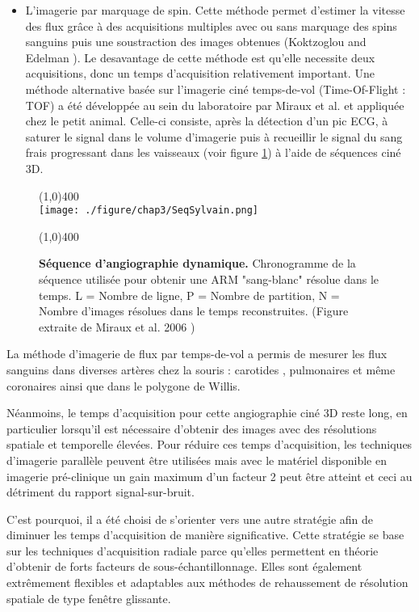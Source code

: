 \begin{itemize}
\item L’imagerie par marquage de spin. Cette méthode permet d’estimer la vitesse des flux grâce à des acquisitions multiples avec ou sans marquage des spins sanguins puis une soustraction des images obtenues (Koktzoglou and Edelman \cite{Koktzoglou:2009fe}). Le desavantage de cette méthode est qu’elle necessite deux acquisitions, donc un temps d’acquisition relativement important.
Une méthode alternative basée sur l’imagerie ciné temps-de-vol (Time-Of-Flight : TOF) a été développée au sein du laboratoire par  Miraux et al. \cite{Miraux:2006fu} et appliquée chez le petit animal. Celle-ci consiste, après la détection d’un pic ECG, à saturer le signal dans le volume d'imagerie puis à recueillir le signal du sang frais progressant dans les vaisseaux (voir figure \ref{fig:SeqSylvain}) à l’aide de séquences ciné 3D.
\end{itemize}

\begin{figure}[H]
\centering
\line(1,0){400} \\
\texttt{[image: ./figure/chap3/SeqSylvain.png]}
\caption[Séquence d'angiographie dynamique.]{\label{fig:SeqSylvain} \textbf{Séquence d'angiographie dynamique.} Chronogramme de la séquence utilisée pour obtenir une ARM "sang-blanc" résolue dans le temps. L = Nombre de ligne, P = Nombre de partition, N = Nombre d'images résolues dans le temps reconstruites. (Figure extraite de Miraux et al. 2006 \cite{Miraux:2006fu})}
\line(1,0){400} \\ \end{figure}

La méthode d'imagerie de flux par temps-de-vol a permis de mesurer les flux sanguins dans diverses artères chez la souris : carotides \cite{Miraux:2006fu}, pulmonaires \cite{Cochet:2013dk} et même coronaires \cite{Cochet:2010ec} ainsi que dans le polygone de Willis.

Néanmoins, le temps d’acquisition pour cette angiographie ciné 3D reste long, en particulier lorsqu’il est nécessaire d’obtenir des images avec des résolutions spatiale et temporelle élevées. Pour réduire ces temps d’acquisition, les techniques d’imagerie parallèle peuvent être utilisées mais avec le matériel disponible en imagerie pré-clinique un gain maximum d’un facteur 2 peut être atteint et ceci au détriment du rapport signal-sur-bruit. 

C’est pourquoi, il a été choisi de s'orienter vers une autre stratégie afin de diminuer les temps d’acquisition de manière significative. Cette stratégie se base sur les techniques d’acquisition radiale parce qu’elles permettent en théorie d’obtenir de forts facteurs de sous-échantillonnage. Elles sont également extrêmement flexibles et adaptables aux méthodes de rehaussement de résolution spatiale de type fenêtre glissante.

